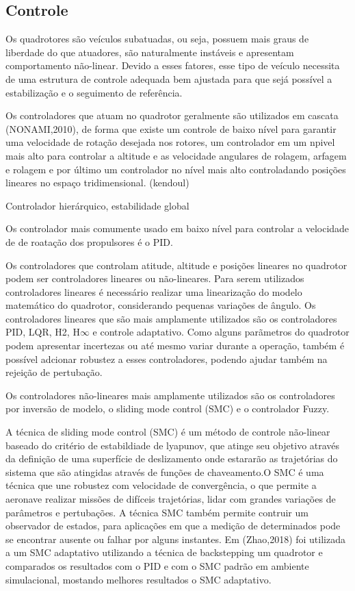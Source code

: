 \subsection{Controle}
Os quadrotores são veículos subatuadas, ou seja, possuem mais graus de liberdade do que atuadores, são naturalmente instáveis e apresentam comportamento não-linear. Devido a esses fatores, esse tipo de veículo necessita de uma estrutura de controle adequada bem ajustada para que sejá possível a estabilização e o seguimento de referência.

Os controladores que atuam no quadrotor geralmente são utilizados em cascata (NONAMI,2010), de forma que existe um controle de baixo nível para garantir uma velocidade de rotação desejada nos rotores, um controlador em um npivel mais alto para controlar a altitude e as velocidade angulares de rolagem, arfagem e rolagem e por último um controlador no nível mais alto controladando posições lineares no espaço tridimensional. (kendoul)

Controlador hierárquico, estabilidade global

Os controlador mais comumente usado em baixo nível para controlar a velocidade de de roatação dos propulsores é o PID. 

Os controladores que controlam atitude, altitude e posições lineares no quadrotor podem ser controladores lineares ou não-lineares. Para serem utilizados controladores lineares é necessário realizar uma linearização do modelo matemático do quadrotor, considerando pequenas variações de ângulo. Os controladores lineares que são mais amplamente utilizados são os controladores PID, LQR, H2, H$\infty$ e controle adaptativo. Como alguns parãmetros do quadrotor podem apresentar incertezas ou até mesmo variar durante a operação, também é possível adcionar robustez a esses controladores, podendo ajudar também na rejeição de pertubação.

Os controladores não-lineares mais amplamente utilizados são os controladores por inversão de modelo, o sliding mode control (SMC) e o controlador Fuzzy.

A técnica de sliding mode control (SMC) é um método de controle não-linear baseado do critério de estabildiade de lyapunov, que atinge seu objetivo através da definição de uma superfície de deslizamento onde estararão as trajetórias do sistema que são atingidas através de funções de chaveamento.O SMC é uma técnica que une robustez com velocidade de convergência, o que permite a aeronave realizar missões de difíceis trajetórias, lidar com grandes variações de parâmetros e pertubações. A técnica SMC também permite contruir um observador de estados, para aplicações em que a medição de determinados pode se encontrar ausente ou falhar por alguns instantes. Em (Zhao,2018) foi utilizada a um SMC adaptativo utilizando a técnica de backstepping um quadrotor e comparados os resultados com o PID e com o SMC padrão em ambiente simulacional, mostando melhores resultados o SMC adaptativo.

